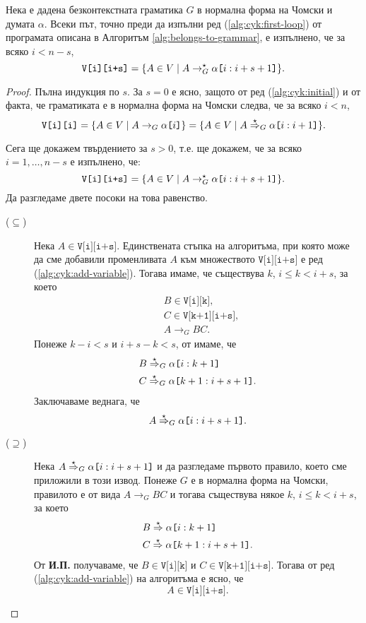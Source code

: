 \begin{lemma}
  Нека е дадена безконтекстната граматика $G$ в нормална форма на Чомски и думата $\alpha$.
  Всеки път, точно преди да изпълни ред (\ref{alg:cyk:first-loop}) от програмата описана в Алгоритъм \ref{alg:belongs-to-grammar},
  е изпълнено, че за всяко $i < n-s$,
  \[\texttt{V[i][i+s]} = \{A \in V \mid A \rightarrow^\star_G \alpha\texttt{[}{i:i+s+1}\texttt{]}\}.\]
\end{lemma}
\begin{proof}
  Пълна индукция по $s$.
  За $s = 0$ е ясно, защото от ред (\ref{alg:cyk:initial}) и от факта, че граматиката е в нормална форма на Чомски следва, че за всяко $i < n$, 
  \[\texttt{V[i][i]} = \{A \in V \mid A \to_G \alpha\texttt{[}{i}\texttt{]}\} = \{A \in V \mid A \stackrel{{\star}}{\Rightarrow}_G \alpha\texttt{[}{i:i+1}\texttt{]}\}.\]
  
  Сега ще докажем твърдението за $s > 0$, т.е. ще докажем, че за всяко $i = 1,\dots,n-s$
  е изпълнено, че:
  \[\texttt{V[i][i+s]} = \{A \in V \mid A \rightarrow^\star_G \alpha\texttt{[}{i:i+s+1}\texttt{]}\}.\]
  Да разгледаме двете посоки на това равенство.
  \begin{description}
  \item[($\subseteq$)]
    Нека $A \in \texttt{V[i][i+s]}$.
    Единствената стъпка на алгоритъма, при която може да сме добавили променливата $A$ към множеството $\texttt{V[i][i+s]}$ е ред (\ref{alg:cyk:add-variable}).
    Тогава имаме, че съществува $k$, $i \leq k < i+s$, за което
    \begin{align*}
      & B \in \texttt{V[i][k]},\\
      & C \in \texttt{V[k+1][i+s]},\\
      & A\to_G BC.
    \end{align*}
    Понеже $k-i < s$ и $i + s - k < s$, от \IndHyp имаме, че
    \begin{align*}
      & B \stackrel{{\star}}{\Rightarrow}_G \alpha\texttt{[}{i:k+1}\texttt{]}\\
      & C \stackrel{{\star}}{\Rightarrow}_G \alpha\texttt{[}{k+1:i+s+1}\texttt{]}.
    \end{align*}
    Заключаваме веднага, че 
    \[A \stackrel{{\star}}{\Rightarrow}_G \alpha\texttt{[}{i:i+s+1}\texttt{]}.\]
  \item[($\supseteq$)]
    Нека $A \stackrel{{\star}}{\Rightarrow}_G \alpha\texttt{[}{i:i+s+1}\texttt{]}$ и да разгледаме първото правило, което сме приложили в този извод.
    Понеже $G$ е в нормална форма на Чомски, правилото е от вида $A \to_G BC$ и тогава съществува някое $k$, $i \leq k < i+s$, за което
    \begin{align*}
      & B \stackrel{{\star}}{\Rightarrow} \alpha\texttt{[}{i:k+1}\texttt{]}\\
      & C \stackrel{{\star}}{\Rightarrow} \alpha\texttt{[}{k+1:i+s+1}\texttt{]}.
    \end{align*}
    От {\bf И.П.} получаваме, че $B \in \texttt{V[i][k]}$ и $C \in \texttt{V[k+1][i+s]}$.
    Тогава от ред (\ref{alg:cyk:add-variable}) на алгоритъма е ясно, че 
    \[A \in \texttt{V[i][i+s]}.\]
  \end{description}
\end{proof}

